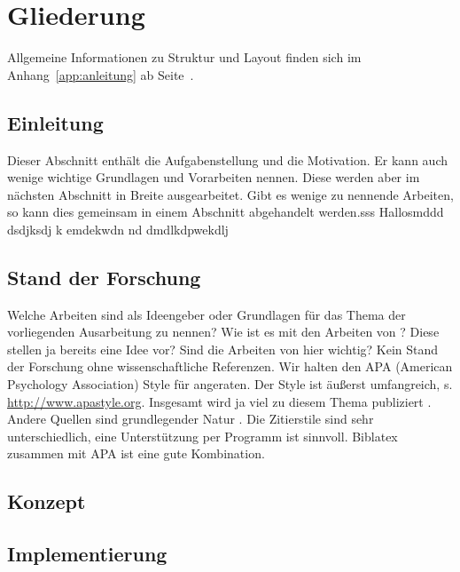 \documentclass[	12pt, 
				a4paper, 
				BCOR=10mm, %
				DIV=12, 
				parskip=half, %
				headings=small, %
				twoside, %
				ngerman,
				bibliography=totoc,index=totoc, listof=totoc,
				numbers=noendperiod
				]{scrbook} %
\theoremstyle{plain}%
\theoremstyle{definition}
\theoremstyle{remark}
\begin{document}

\mainmatter %

\chapter{Gliederung}
Allgemeine Informationen zu Struktur und Layout finden sich im Anhang~\ref{app:anleitung} ab Seite~\pageref{app:anleitung}.

\section{Einleitung}
\label{sec:einleitung}


Dieser Abschnitt enthält die Aufgabenstellung und die Motivation. Er kann auch
wenige wichtige Grundlagen und Vorarbeiten nennen. Diese werden aber im nächsten Abschnitt in Breite ausgearbeitet. Gibt es wenige zu nennende Arbeiten, so kann dies gemeinsam in einem Abschnitt abgehandelt werden.sss Hallosmddd dsdjksdj k emdekwdn nd dmdlkdpwekdlj 

\section{Stand der Forschung}
\label{sec:forschungsstand}
Welche Arbeiten sind als Ideengeber oder Grundlagen für das Thema der vorliegenden Ausarbeitung zu nennen? Wie ist es mit den Arbeiten von \textcite{fischbach:2012a}? Diese stellen ja bereits eine Idee vor? Sind die Arbeiten von \textcite{fischbach:2012a} hier wichtig? Kein Stand der Forschung ohne wissenschaftliche Referenzen. Wir halten den APA (American Psychology Association) Style für angeraten. Der Style ist äußerst umfangreich, s. \url{http://www.apastyle.org}. Insgesamt wird ja viel zu diesem Thema publiziert \parencite{wiebusch:2012a}. Andere Quellen sind grundlegender Natur \parencites{latoschik:2012a,latoschik:2011,fischbach:2011,Rehfeld:2010,wiebusch:2010,latoschik:2010}. Die Zitierstile sind sehr unterschiedlich, eine Unterstützung per Programm ist sinnvoll. Biblatex zusammen mit APA ist eine gute Kombination. 

\section{Konzept}
\label{sec:konzept}
\section{Implementierung}
\label{sec:implementierung}
\end{document}
